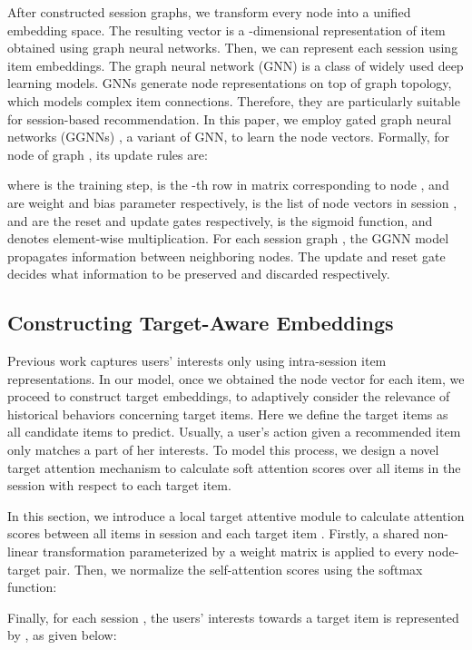 \documentclass[sigconf]{acmart}
\begin{document}
After constructed session graphs, we transform every node  into a unified embedding space. The resulting vector  is a -dimensional representation of item  obtained using graph neural networks. Then, we can represent each session  using item embeddings. The graph neural network (GNN) \cite{Scarselli:2009ku,Kipf:2016tc,Li:2016vj} is a class of widely used deep learning models. GNNs generate node representations on top of graph topology, which models complex item connections. Therefore, they are particularly suitable for session-based recommendation. In this paper, we employ gated graph neural networks (GGNNs) \cite{Li:2016vj}, a variant of GNN, to learn the node vectors. Formally, for node  of graph , its update rules are:

where  is the training step,  is the -th row in matrix  corresponding to node ,  and  are weight and bias parameter respectively,  is the list of node vectors in session ,  and  are the reset and update gates respectively,  is the sigmoid function, and  denotes element-wise multiplication. For each session graph , the GGNN model propagates information between neighboring nodes. The update and reset gate decides what information to be preserved and discarded respectively. 

\subsection{Constructing Target-Aware Embeddings}

Previous work captures users' interests only using intra-session item representations. In our model, once we obtained the node vector for each item, we proceed to construct target embeddings, to adaptively consider the relevance of historical behaviors concerning target items. Here we define the target items as all candidate items to predict. Usually, a user's action given a recommended item only matches a part of her interests. To model this process, we design a novel target attention mechanism to calculate soft attention scores over all items in the session with respect to each target item.

In this section, we introduce a local target attentive module to calculate attention scores between all items  in session  and each target item . Firstly, a shared non-linear transformation parameterized by a weight matrix  is applied to every node-target pair. Then, we normalize the self-attention scores using the softmax function:

Finally, for each session , the users' interests towards a target item  is represented by , as given below:
\end{document}
